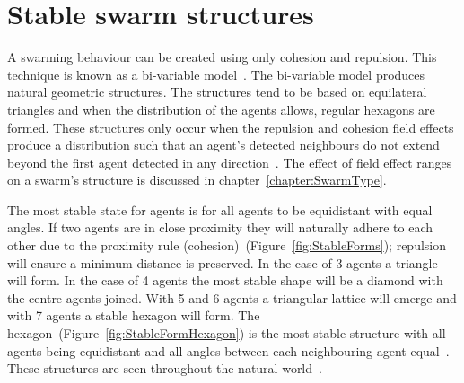 
\section{Stable swarm structures}
A swarming behaviour can be created using only cohesion and repulsion. This technique is known as a bi-variable model~\cite{BAF:06,BAFVM:06}. The bi-variable model produces natural geometric structures. The structures tend to be based on equilateral triangles and when the distribution of the agents allows, regular hexagons are formed. These structures only occur when the repulsion and cohesion field effects produce a distribution such that an agent's detected neighbours do not extend beyond the first agent detected in any direction~\cite{PCL:08, PCL:08a}. The effect of field effect ranges on a swarm's structure is discussed in chapter~\ref{chapter:SwarmType}.  

The most stable state for agents is for all agents to be equidistant with equal angles. If two agents are in close proximity they will naturally adhere to each other due to the proximity rule (cohesion)~(Figure~\ref{fig:StableForms}); repulsion will ensure a minimum distance is preserved. In the case of 3 agents a triangle will form. In the case of 4 agents the most stable shape will be a diamond with the centre agents joined. With 5 and 6 agents a triangular lattice will emerge and with 7 agents a stable hexagon will form. The hexagon~(Figure~\ref{fig:StableFormHexagon}) is the most stable structure with all agents being equidistant and all angles between each neighbouring agent equal~\cite{BAF:06, GP:05}. These structures are seen throughout the natural world~\cite{RAZ:13}.

